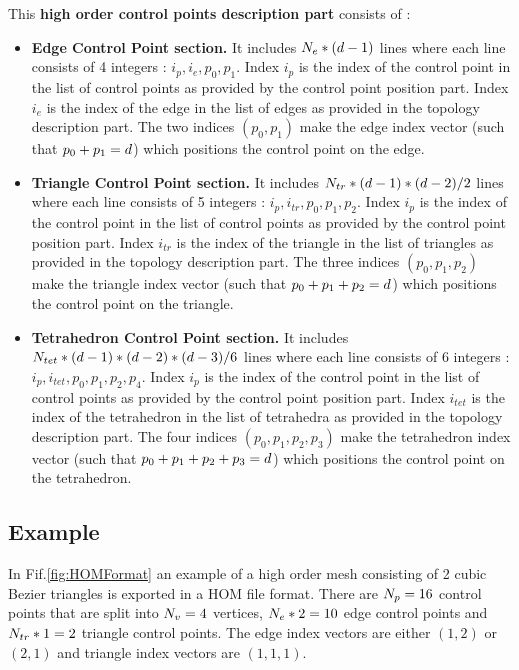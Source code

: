 \documentclass[a4paper,11pt]{article}
\begin{document}
This {\bf high order control points description part}  consists of :
\begin{itemize}
\item {\bf Edge Control Point section.} It includes ${ N_e}*({d}-1)$ lines where each line consists of 4 integers : $i_p, i_e, p_0, p_1$. Index $i_p$ is the index of the control point in the list of control points as provided by the control point position part. Index $i_e$ is the index of the edge in the list of edges as provided in the topology description part. The two indices $(p_0,p_1)$ make the edge index vector (such that $p_0+p_1={d}$) which positions the control point on the edge.
\item {\bf Triangle Control Point section.} It includes ${N_{tr}}*({d}-1)*({d}-2)/2$ lines where each line consists of 5 integers : $i_p, i_{tr}, p_0, p_1, p_2$. Index $i_p$ is the index of the control point in the list of control points as provided by the control point position part. Index $i_{tr}$ is the index of the triangle in the list of triangles as provided in the topology description part. The three indices $(p_0,p_1,p_2)$ make the triangle index vector (such that $p_0+p_1+p_2={d}$) which positions the control point on the triangle.
\item {\bf Tetrahedron Control Point section.} It includes ${N_{tet}}*({d}-1)*({d}-2)*({d}-3)/6$ lines where each line consists of 6 integers : $i_p, i_{tet}, p_0, p_1, p_2, p_4$. Index $i_p$ is the index of the control point in the list of control points as provided by the control point position part. Index $i_{tet}$ is the index of the tetrahedron in the list of tetrahedra as provided in the topology description part. The four indices $(p_0,p_1,p_2,p_3)$ make the tetrahedron index vector (such that $p_0+p_1+p_2+p_3={d}$) which positions the control point on the tetrahedron.
\end{itemize}

\subsection{Example}

In Fif.\ref{fig:HOMFormat} an example of a high order mesh consisting of 2 cubic Bezier triangles is exported in a HOM file format. There are ${N_{p}}=16$ control points that are split into ${N_v}=4$ vertices, ${ N_e}*2=10$ edge control points and ${N_{tr}}*1=2$ triangle control points.  The edge index vectors are either $(1,2)$ or $(2,1)$ and triangle index vectors are $(1,1,1)$.
\end{document}
